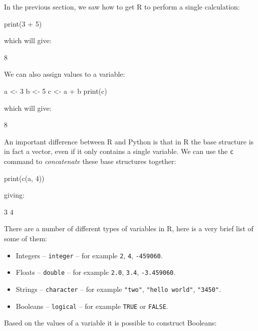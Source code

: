 In the previous section, we saw how to get R to perform a single
calculation:

\begin{Rin}
print(3 + 5)
\end{Rin}

which will give:

\begin{Rout}
[1] 8
\end{Rout}

We can also assign values to a variable:

\begin{Rin}
a <- 3
b <- 5
c <- a + b
print(c)
\end{Rin}

which will give:

\begin{Rout}
[1] 8
\end{Rout}

An important difference between R and Python is that in R the base structure is
in fact a vector, even if it only contains a single variable. We can use the
\texttt{c} command to \textit{concatenate} these base structures
together:

\begin{Rin}
print(c(a, 4))
\end{Rin}

giving:

\begin{Rout}
[1] 3 4
\end{Rout}

There are a number of different types of variables in R, here is a very
brief list of some of them:

\begin{itemize}
    \item Integers -- \texttt{integer} -- for example \texttt{2},
        \texttt{4}, \texttt{-459060}.
    \item Floats -- \texttt{double} -- for example \texttt{2.0},
        \texttt{3.4}, \texttt{-3.459060}.
    \item Strings -- \texttt{character} -- for example
        \texttt{"two"}, \texttt{"hello world"}, \texttt{"3450"}.
    \item Booleans -- \texttt{logical} -- for example
        \texttt{TRUE} or
        \texttt{FALSE}.
\end{itemize}

Based on the values of a variable it is possible to construct Booleans:

